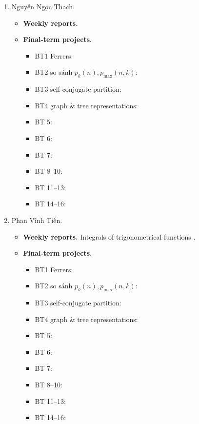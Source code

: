 \documentclass{article}
\begin{document}
\begin{enumerate}
\begin{itemize}
\begin{itemize}
        \end{itemize}
    \end{itemize}
    \item {\sc Nguyễn Ngọc Thạch.}
    \begin{itemize}
        \item {\bf Weekly reports.}
        \item {\bf Final-term projects.}
        \begin{itemize}
            \item BT1 Ferrers:
            \item BT2 so sánh $p_k(n),p_{\max}(n,k)$:
            \item BT3 self-conjugate partition:
            \item BT4 graph \& tree representations:
            \item BT 5:
            \item BT 6:
            \item BT 7:
            \item BT 8--10:
            \item BT 11--13:
            \item BT 14--16:
        \end{itemize}
    \end{itemize}
    \item {\sc Phan Vĩnh Tiến.}
    \begin{itemize}
        \item {\bf Weekly reports.} Integrals of trigonometrical functions .
        \item {\bf Final-term projects.}
        \begin{itemize}
            \item BT1 Ferrers:
            \item BT2 so sánh $p_k(n),p_{\max}(n,k)$:
            \item BT3 self-conjugate partition:
            \item BT4 graph \& tree representations:
            \item BT 5:
            \item BT 6:
            \item BT 7:
            \item BT 8--10:
            \item BT 11--13:
            \item BT 14--16:
        \end{itemize}
    \end{itemize}
\end{enumerate}
\end{document}

